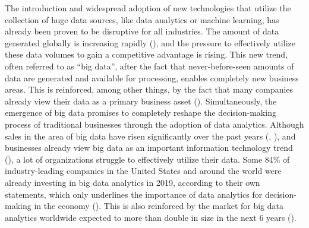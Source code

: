 The introduction and widespread adoption of new technologies that utilize the collection of huge data sources, like data analytics or machine learning, has already been proven to be disruptive for all industries. The amount of data generated globally is increasing rapidly (\cite{Seagate.2018}), and the pressure to effectively utilize these data volumes to gain a competitive advantage is rising. This new trend, often referred to as \enquote{big data}, after the fact that never-before-seen amounts of data are generated and available for processing, enables completely new business areas. This is reinforced, among other things, by the fact that many companies already view their data as a primary business asset (\cite{Redman.2008}). Simultaneously, the emergence of big data promises to completely reshape the decision-making process of traditional businesses through the adoption of data analytics. Although sales in the area of big data have risen significantly over the past years (\cite{BISResearch.2018}, \cite{Bitkom.2018}), and businesses already view big data as an important information technology trend (\cite{Bitkom.2017}), a lot of organizations struggle to effectively utilize their data. Some 84\% of industry-leading companies in the United States and around the world were already investing in big data analytics in 2019, according to their own statements, which only underlines the importance of data analytics for decision-making in the economy (\cite{statista.2019}). This is also reinforced by the market for big data analytics worldwide expected to more than double in size in the next 6 years (\cite{statista.2022}).


